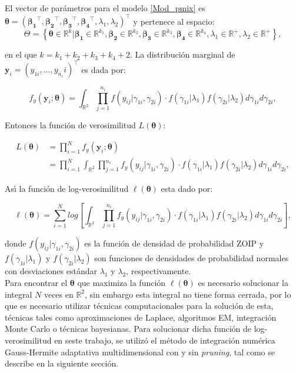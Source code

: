 El vector de par\'{a}metros para el modelo \eqref{Mod_pmix} es $\boldsymbol{\theta}=(\boldsymbol{\beta_1}^{\top},\boldsymbol{\beta_2}^{\top},\boldsymbol{\beta_3}^{\top}, \boldsymbol{\beta_4}^{\top},\lambda_1,\lambda_2)^{\top}$ y pertenece al espacio:
\[
\Theta=\left\{\boldsymbol{\theta} \in \mathbb{R}^k | \boldsymbol{\beta_1} \in \mathbb{R}^{k_1}, \boldsymbol{\beta_2} \in \mathbb{R}^{k_2}, \boldsymbol{\beta_3} \in \mathbb{R}^{k_3}, \boldsymbol{\beta_4} \in \mathbb{R}^{k_4}, \lambda_1 \in \mathbb{R}^+, \lambda_2 \in \mathbb{R}^+  \right\},
\]

en el que $k=k_1+k_2+k_3+k_4+2$. La distribuci\'{o}n marginal de $\mathbf{y}_i=(y_{1i},\ldots, y_{n_i}i)^{\top}$ es dada por:

\[
f_y(\mathbf{y}_i;\boldsymbol{\theta})=\int_{\mathbb{R}^2}\prod_{j=1}^{n_i}f(y_{ij}|\gamma_{1i},\gamma_{2i})\cdot f(\gamma_{1i}|\lambda_1) f(\gamma_{2i}|\lambda_2) d\gamma_{1i}d\gamma_{2i},
\]

Entonces la funci\'{o}n de verosimilitud $L(\boldsymbol{\theta})$:



\begin{align*}
L(\boldsymbol{\theta}) &= \prod_{i=1}^{N}f_y(\mathbf{y}_i;\boldsymbol{\theta})\\
&= \prod_{i=1}^{N}\int_{\mathbb{R}^2}\prod_{j=1}^{n_i}f_y(y_{ij}|\gamma_{1i},\gamma_{2i})\cdot f(\gamma_{1i}|\lambda_1) f(\gamma_{2i}|\lambda_2) d\gamma_{1i}d\gamma_{2i},
\end{align*}

As\'{\i} la funci\'{o}n de log-verosimilitud $\ell(\boldsymbol{\theta})$ esta dado por:

\begin{equation}
\ell(\boldsymbol{\theta})=\sum_{i=1}^{N}log \left[\int_{\mathbb{R}^2}\prod_{j=1}^{n_i}f_y(y_{ij}|\gamma_{1i},\gamma_{2i})\cdot f(\gamma_{1i}|\lambda_1) f(\gamma_{2i}|\lambda_2) d\gamma_{1i}d\gamma_{2i}\right],
 \label{func_ver_mix}
\end{equation}


donde $f(y_{ij}|\gamma_{1i},\gamma_{2i})$ es la funci\'{o}n de densidad de probabilidad ZOIP y $f(\gamma_{1i}|\lambda_1)$ y $f(\gamma_{2i}|\lambda_2)$ son funciones de densidades de probabilidad normales con desviaciones est\'{a}ndar $\lambda_1$ y $\lambda_2$, respectivamente.\\

Para encontrar el $\boldsymbol{\theta}$ que maximiza la funci\'{o}n $\ell(\boldsymbol{\theta})$ es necesario solucionar la integral $N$ veces en $\mathbb{R}^2$, sin embargo esta integral no tiene forma cerrada, por lo que es necesario utilizar t\'{e}cnicas computacionales para la soluci\'{o}n de esta, t\'{e}cnicas tales como aproximaciones de Laplace, algoritmos EM, integraci\'{o}n Monte Carlo o t\'{e}cnicas bayesianas. Para solucionar dicha funci\'{o}n de log-verosimilitud en seste trabajo, se utiliz\'{o} el m\'{e}todo de integraci\'{o}n num\'{e}rica Gauss-Hermite adaptativa multidimensional con y sin \textit{pruning}, tal como se describe en la siguiente secci\'{o}n.


